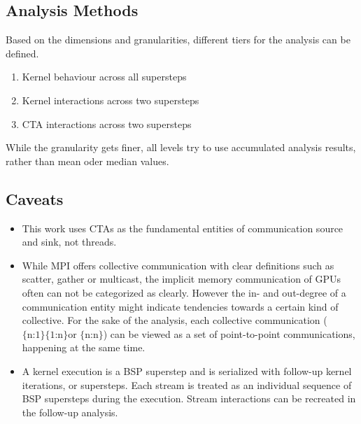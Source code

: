 \subsection{Analysis Methods}\label{methodik:methods}
Based on the dimensions and granularities, different tiers for the analysis can be defined.
\begin{enumerate}[I]
	\item Kernel behaviour across all supersteps
	\item Kernel interactions across two supersteps
	\item CTA interactions across two supersteps
\end{enumerate}
While the granularity gets finer, all levels try to use accumulated analysis results, rather than mean oder median values.


\subsection{Caveats}\label{collectives}
\begin{itemize}
	\item This work uses CTAs as the fundamental entities of communication source and sink, not threads.
	\item While MPI offers collective communication with clear definitions such as scatter, gather or multicast, the implicit memory communication of GPUs often can not be categorized as clearly. However the in- and out-degree of a communication entity might indicate tendencies towards a certain kind of collective.
	For the sake of the analysis, each collective communication ($\textrm{\{n:1\} \{1:n\} or \{n:n\}} $) can be viewed as a set of point-to-point communications, happening at the same time.
	\item  A kernel execution is a BSP superstep and is serialized with follow-up kernel iterations, or supersteps. Each stream is treated as
	an individual sequence of BSP supersteps during the execution. Stream interactions can be recreated in the follow-up analysis.
\end{itemize}